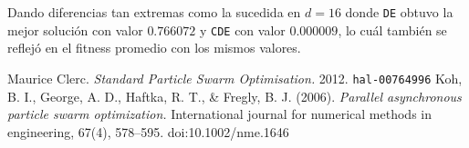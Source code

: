 \documentclass[10pt, letterpaper]{article}
\theoremstyle{definition}
\begin{document}
\begin{enumerate}
\begin{enumerate}
\begin{center}
              \end{center}
              Dando diferencias tan extremas como la sucedida en $d=16$ donde
              \texttt{DE} obtuvo la mejor solución con valor $0.766072$ y
              \texttt{CDE} con valor $0.000009$, lo cuál también se reflejó
              en el fitness promedio con los mismos valores.
    \end{enumerate}
\end{enumerate}


\clearpage
\begin{thebibliography}{9}
        Maurice Clerc.
        \textit{Standard Particle Swarm Optimisation.}
        2012. \texttt{hal-00764996}
        Koh, B. I., George, A. D., Haftka, R. T., \& Fregly, B. J. (2006).
        \textit{Parallel asynchronous particle swarm optimization.}
        International journal for numerical methods in engineering,
        67(4), 578–595. doi:10.1002/nme.1646
\end{thebibliography}
\end{document}
